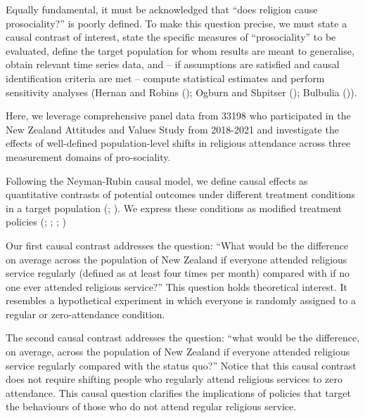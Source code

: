 \documentclass[
  single column]{article}
\begin{document}
Equally fundamental, it must be acknowledged that ``does religion cause
prosociality?'' is poorly defined. To make this question precise, we
must state a causal contrast of interest, state the specific measures of
``prosociality'' to be evaluated, define the target population for whom
results are meant to generalise, obtain relevant time series data, and
-- if assumptions are satisfied and causal identification criteria are
met -- compute statistical estimates and perform sensitivity analyses
(Hernan and Robins (); Ogburn and
Shpitser (); Bulbulia
()).

Here, we leverage comprehensive panel data from 33198 who participated
in the New Zealand Attitudes and Values Study from 2018-2021 and
investigate the effects of well-defined population-level shifts in
religious attendance across three measurement domains of pro-sociality.

Following the Neyman-Rubin causal model, we define causal effects as
quantitative contrasts of potential outcomes under different treatment
conditions in a target population (; ). We express these
conditions as modified treatment policies
(;
;
;
)

Our first causal contrast addresses the question: ``What would be the
difference on average across the population of New Zealand if everyone
attended religious service regularly (defined as at least four times per
month) compared with if no one ever attended religious service?'' This
question holds theoretical interest. It resembles a hypothetical
experiment in which everyone is randomly assigned to a regular or
zero-attendance condition.

The second causal contrast addresses the question: ``what would be the
difference, on average, across the population of New Zealand if everyone
attended religious service regularly compared with the status quo?''
Notice that this causal contrast does not require shifting people who
regularly attend religious services to zero attendance. This causal
question clarifies the implications of policies that target the
behaviours of those who do not attend regular religious service.
\end{document}

